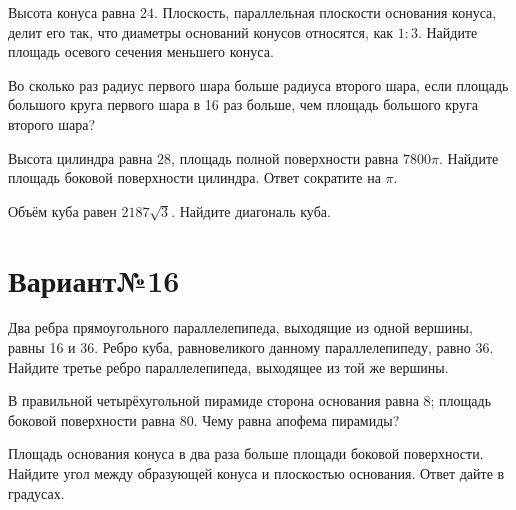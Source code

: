 \documentclass[4apaper]{article}
\begin{document}
\begin{taskBN}{3}
Высота конуса равна $24$. Плоскость, параллельная плоскости основания конуса,  делит его так, что диаметры оснований конусов относятся, как $1:3$. Найдите площадь осевого сечения меньшего конуса. 
\end{taskBN}

\begin{taskBN}{4}
Во сколько раз радиус первого шара больше радиуса второго шара, если площадь большого круга первого шара в 16 раз больше, чем площадь большого круга второго шара?
\end{taskBN}

\begin{taskBN}{5}
Высота цилиндра равна $28$, площадь полной поверхности равна $7800\pi$. Найдите площадь боковой поверхности цилиндра. Ответ сократите на $\pi$.
\end{taskBN}

\begin{taskBN}{6}
Объём куба равен $2187\sqrt{3}$. Найдите диагональ куба.
\end{taskBN}
\newpage\section*{Вариант№16}

\begin{taskBN}{1}
Два ребра прямоугольного параллелепипеда, выходящие из одной вершины, равны 16 и 36. Ребро куба, равновеликого данному параллелепипеду, равно 36. Найдите третье ребро параллелепипеда, выходящее из той же вершины.
\end{taskBN}

\begin{taskBN}{2}
В правильной четырёхугольной пирамиде сторона основания равна 8; площадь боковой поверхности равна 80. Чему равна апофема пирамиды?
\end{taskBN}

\begin{taskBN}{3}
Площадь основания конуса в два раза больше площади боковой поверхности. Найдите угол между образующей конуса и плоскостью основания. Ответ дайте в градусах.
\end{taskBN}
\end{document}
